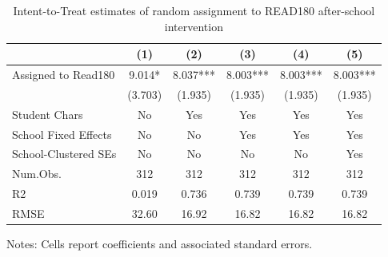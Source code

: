 \begin{table}
\centering
\caption{Intent-to-Treat estimates of random assignment to READ180 after-school intervention \label{tab:itt}}
\centering
\begin{threeparttable}
\begin{tabular}[t]{lccccc}
\toprule
  & (1) & (2) & (3) & (4) & (5)\\
\midrule
Assigned to Read180 & 9.014* & 8.037*** & 8.003*** & 8.003*** & 8.003***\\
 & (3.703) & (1.935) & (1.935) & (1.935) & (1.935)\\
\midrule
Student Chars & No & Yes & Yes & Yes & Yes\\
School Fixed Effects & No & No & Yes & Yes & Yes\\
School-Clustered SEs & No & No & No & No & Yes\\
Num.Obs. & 312 & 312 & 312 & 312 & 312\\
R2 & 0.019 & 0.736 & 0.739 & 0.739 & 0.739\\
RMSE & 32.60 & 16.92 & 16.82 & 16.82 & 16.82\\
\bottomrule
\end{tabular}
\begin{tablenotes}
\item Notes: Cells report coefficients and associated standard errors.
\end{tablenotes}
\end{threeparttable}
\end{table}
